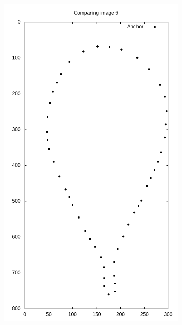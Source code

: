 \begin{frame}
\begin{figure}[ht!]
\begin{subfigure}[b]{0.19\textwidth}
		\end{subfigure}
		\begin{subfigure}[b]{0.19\textwidth}
			\centering
			\includegraphics[width=\textwidth]{img/points.png}
		\end{subfigure}
		\begin{subfigure}[b]{0.19\textwidth}
			\centering

\end{subfigure}
\end{figure}
\end{frame}

